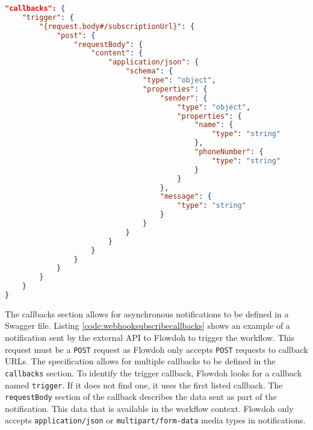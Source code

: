 \begin{minipage}{\textwidth}
\begin{lstlisting}[caption={Webhook subscribe request - the callbacks section},label={code:webhooksubscribecallbacks},language=json]
"callbacks": {
    "trigger": {
        "{request.body#/subscriptionUrl}": {
            "post": {
                "requestBody": {
                    "content": {
                        "application/json": {
                            "schema": {
                                "type": "object",
                                "properties": {
                                    "sender": {
                                        "type": "object",
                                        "properties": {
                                            "name": {
                                                "type": "string"
                                            },
                                            "phoneNumber": {
                                                "type": "string"
                                            }
                                        }
                                    },
                                    "message": {
                                        "type": "string"
                                    }
                                }
                            }
                        }
                    }
                }
            }
        }
    }
}
\end{lstlisting}
\end{minipage}
The callbacks section allows for asynchronous notifications to be defined in a Swagger file. Listing \ref{code:webhooksubscribecallbacks} shows an example of a notification sent by the external API to Flowdoh to trigger the workflow. This request must be a \texttt{POST} request as Flowdoh only accepts \texttt{POST} requests to callback URLs. The specification allows for multiple callbacks to be defined in the \texttt{callbacks} section. To identify the trigger callback, Flowdoh looks for a callback named \texttt{trigger}. If it does not find one, it uses the first listed callback. The \texttt{requestBody} section of the callback describes the data sent as part of the notification. This data that is available in the workflow context. Flowdoh only accepts \texttt{application/json} or \texttt{multipart/form-data} media types in notifications.\\

